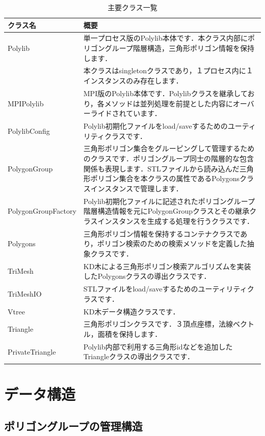 {\begin{table}[htbp]
 \begin{tabular}{|l|p{32em}|} \hline
 クラス名 & 概要 \\\hline
 \hline
 \multicolumn{1}{|l|}{Polylib} & 単一プロセス版のPolylib本体です．本クラス内部にポリゴングループ階層構造，三角形ポリゴン情報を保持します． \\
 \multicolumn{1}{|l|}{} & 本クラスはsingletonクラスであり，１プロセス内に１インスタンスのみ存在します． \\\hline
 MPIPolylib & MPI版のPolylib本体です．Polylibクラスを継承しており，各メソッドは並列処理を前提とした内容にオーバーライドされています． \\\hline
 PolylibConfig & Polylib初期化ファイルをload/saveするためのユーティリティクラスです． \\\hline
 PolygonGroup & 三角形ポリゴン集合をグルーピングして管理するためのクラスです．ポリゴングループ同士の階層的な包含関係も表現します．STLファイルから読み込んだ三角形ポリゴン集合を本クラスの属性であるPolygonsクラスインスタンスで管理します． \\\hline
 PolygonGroupFactory & Polylib初期化ファイルに記述されたポリゴングループ階層構造情報を元にPolygonGroupクラスとその継承クラスインスタンスを生成する処理を行うクラスです． \\\hline
 Polygons & 三角形ポリゴン情報を保持するコンテナクラスであり，ポリゴン検索のための検索メソッドを定義した抽象クラスです． \\\hline
 TriMesh & KD木による三角形ポリゴン検索アルゴリズムを実装したPolygonsクラスの導出クラスです． \\\hline
 TriMeshIO & STLファイルをload/saveするためのユーティリティクラスです． \\\hline
 Vtree & KD木データ構造クラスです． \\\hline
 Triangle & 三角形ポリゴンクラスです．３頂点座標，法線ベクトル，面積を保持します． \\\hline
 PrivateTriangle & Polylib内部で利用する三角形idなどを追加したTriangleクラスの導出クラスです． \\\hline
 \end{tabular}
 \caption{主要クラス一覧}
 \label{tbl:classes}
\end{table}

%
\section{データ構造}

\subsection{ポリゴングループの管理構造}

}
